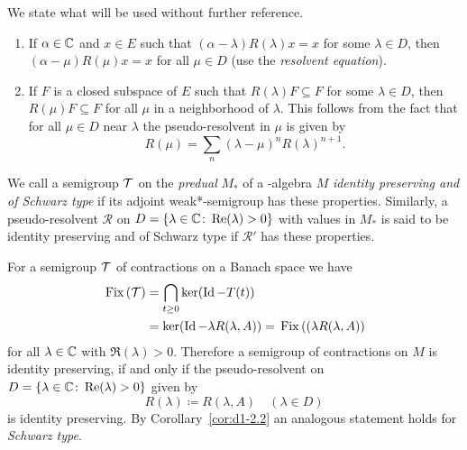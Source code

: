 We state what will be used without further reference.
\begin{enumerate}[\upshape(i), wide, labelindent=.25em]
\item 
If\/ $ \alpha \in \mathbb{C} $ and $ x \in E $ such that $ (\alpha - \lambda)R(\lambda)x = x $ for some $ \lambda \in D $, then $ (\alpha - \mu)R(\mu)x = x $ for all $ \mu \in D $ (use the \emph{resolvent equation}).

\item 
If\/ $ F $ is a closed subspace of\/ $ E $ such that $ R(\lambda)F \subseteq F $ for some $ \lambda \in D $, then $ R(\mu)F \subseteq F $ for all $ \mu $ in a neighborhood of\/ $ \lambda $.
This follows from the fact that for all $ \mu \in D $ near $ \lambda $ the pseudo-resolvent in $ \mu $ is given by
\[
R(\mu) = \sum_{n} (\lambda - \mu)^{n} R(\lambda)^{n+1}.
\]
\end{enumerate}
\begin{definition}\label{def:d1-2.5}
We call a semigroup $ \mathcal{T} $ on the \emph{predual} $ M_{*} $ of a \WA-algebra $ M $ \emph{identity preserving and of Schwarz type} if its adjoint weak*-semigroup has these properties.
Similarly, a pseudo-resolvent $ \mathcal{R} $ on $ D = \{\lambda \in \mathbb{C} \colon \mathop{}\!\mathrm{Re}(\lambda) > 0\} $ with values in $ M_{*} $ is said to be identity preserving and of Schwarz type if\/ $ \mathcal{R}' $ has these properties.
\end{definition}
For a semigroup $ \mathcal{T} $ of contractions on a Banach space we have
\begin{align*}
	\Fix{\TT} &= \bigcap_{t \geq 0} \ker(\Id  - T(t)) \\ 
			& = \ker(\Id - \lambda R(\lambda,A)) = \Fix{ (\lambda R(\lambda,A) }
\end{align*}
for all $ \lambda \in \mathbb{C} $ with $ \Re(\lambda) > 0 $.
Therefore a semigroup of contractions on $ M $ is identity preserving, if and only if the pseudo-resolvent on 
$ D = \{\lambda \in \mathbb{C} \colon \mathop{}\!\mathrm{Re}(\lambda) > 0\} $ given by
\[
	R(\lambda) \coloneq R(\lambda,A) \quad (\lambda \in D)
\]
is identity preserving.
By Corollary~\ref{cor:d1-2.2} an analogous statement holds for \emph{Schwarz type}.
